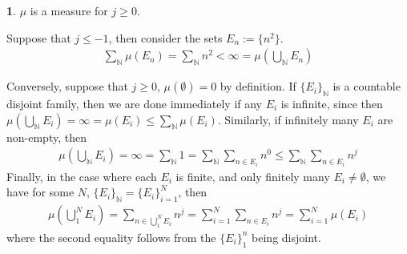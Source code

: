 \documentclass[11pt]{article}
\theoremstyle{definition}
\newtheorem{pb}{}
\newcommand{\set}[1]{\{#1\}}
\begin{document}
	\begin{pb}
		\(\mu\) is a measure for \(j \geq 0\).

		Suppose that \(j \leq -1\), then consider the sets \(E_n := \set{n^2}\).
        \begin{align*}\sum_\mathbb{N} \mu(E_n) = \sum_\mathbb{N} n^2 < \infty = \mu\left(\bigcup_\mathbb{N} E_n\right)\end{align*}

        Conversely, suppose that \(j \geq 0\), \(\mu(\emptyset) = 0\) by definition. If \(\set{E_i}_\mathbb{N}\) is a countable disjoint family,
        then we are done immediately if any \(E_i\) is infinite, since then \(\mu\left(\bigcup_\mathbb{N}E_i\right) = \infty = \mu(E_i) \leq \sum_\mathbb{N} \mu(E_i)\).
        Similarly, if infinitely many \(E_i\) are non-empty, then
        \begin{align*}
           \mu\left(\bigcup_\mathbb{N}E_i\right) = \infty = \sum_\mathbb{N} 1 = \sum_{\mathbb{N}} \sum_{n \in E_i} n^0 \leq \sum_{\mathbb{N}} \sum_{n \in E_i} n^j
        \end{align*}
        Finally, in the case where each \(E_i \) is finite, and only finitely many \(E_i \neq \emptyset\), we have for some \(N\), \(\set{E_i}_\mathbb{N} = \set{E_i}_{i=1}^N\), then
        \begin{align*}
            \mu\left(\bigcup_1^N E_i\right) = \sum_{n \in \bigcup_1^N E_i} n^j = \sum_{i =1}^N \sum_{n\in E_i} n^j = \sum_{i=1}^N \mu(E_i)
        \end{align*}
        where the second equality follows from the \(\set{E_i}_1^n\) being disjoint.
	\end{pb}
\end{document}
